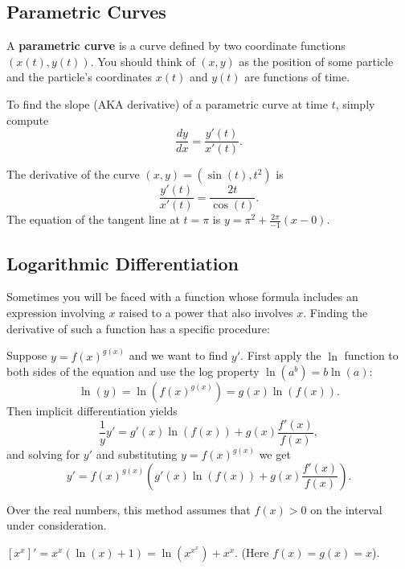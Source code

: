 \subsection{Parametric Curves}

A \textbf{parametric curve} is a curve defined by two coordinate functions $(x(t), y(t))$. You should think of $(x,y)$ as the position of some particle and the particle's coordinates $x(t)$ and $y(t)$ are functions of time.

To find the slope (AKA derivative) of a parametric curve at time $t$, simply compute
$$\frac{dy}{dx}=\frac{y'(t)}{x'(t)}.$$
\begin{exampleblock}
    The derivative of the curve $(x,y)=(\sin(t), t^2)$ is
    $$\frac{y'(t)}{x'(t)}=\frac{2t}{\cos(t)}.$$
    The equation of the tangent line at $t=\pi$ is $y=\pi^2+\frac{2\pi}{-1}(x-0).$
\end{exampleblock}

\subsection{Logarithmic Differentiation}

Sometimes you will be faced with a function whose formula includes an expression involving $x$ raised to a power that also involves $x$. Finding the derivative of such a function has a specific procedure:
\begin{strat}
Suppose $y=f(x)^{g(x)}$ and we want to find $y'$. First apply the $\ln$ function to both sides of the equation and use the log property $\ln(a^b)=b\ln(a)$:
$$\ln(y)=\ln(f(x)^{g(x)})=g(x)\ln(f(x)).$$
Then implicit differentiation yields
$$\frac{1}{y}y'=g'(x)\ln(f(x))+g(x)\frac{f'(x)}{f(x)},$$
and solving for $y'$ and substituting $y=f(x)^{g(x)}$ we get
$$y'=f(x)^{g(x)}\left(g'(x)\ln(f(x))+g(x)\frac{f'(x)}{f(x)}\right).$$
\end{strat}

\begin{remark}
Over the real numbers, this method assumes that $f(x)>0$ on the interval under consideration. 
\end{remark}

\begin{exampleblock}
$[x^x]'=x^x(\ln(x)+1)=\ln(x^{x^x})+x^x$. (Here $f(x)=g(x)=x$).
\end{exampleblock}

